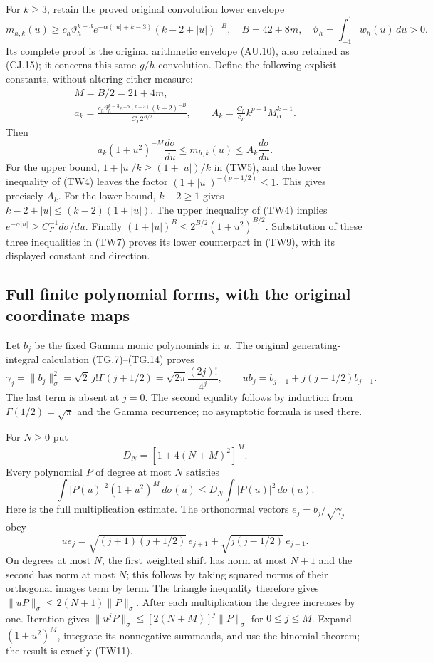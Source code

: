 \documentclass[11pt,a4paper]{article}
\begin{document}
For $k\geq3$, retain the proved original convolution lower envelope
\[
 m_{h,k}(u)\geq c_h\vartheta_h^{k-3}
 e^{-\alpha(|u|+k-3)}(k-2+|u|)^{-B},\quad
 B=42+8m,\quad \vartheta_h=\int_{-1}^{1}w_h(u)\,du>0.
 \tag{TW7}
\]
Its complete proof is the original arithmetic envelope (AU.10), also
retained as (CJ.15); it concerns this same $g/h$ convolution.
Define the following explicit constants, without altering either measure:
\[
 \begin{gathered}
 M=B/2=21+4m,\\
 a_k=\frac{c_h\vartheta_h^{k-3}e^{-\alpha(k-3)}(k-2)^{-B}}
 {C_\Gamma 2^{B/2}},\qquad
 A_k=\frac{C_h}{c_\Gamma}k^{p+1}M_\alpha^{k-1}.
 \end{gathered}\tag{TW8}
\]
Then
\[
 \boxed{
 a_k(1+u^2)^{-M}\frac{d\sigma}{du}
 \leq m_{h,k}(u)\leq A_k\frac{d\sigma}{du}.}
 \tag{TW9}
\]
For the upper bound, $1+|u|/k\geq(1+|u|)/k$ in (TW5), and the
lower inequality of (TW4) leaves the factor
$(1+|u|)^{-(p-1/2)}\leq1$.  This gives precisely $A_k$.
For the lower bound, $k-2\geq1$ gives
$k-2+|u|\leq(k-2)(1+|u|)$.  The upper inequality of (TW4) implies
$e^{-\alpha|u|}\geq C_\Gamma^{-1}d\sigma/du$.
Finally $(1+|u|)^B\leq2^{B/2}(1+u^2)^{B/2}$.
Substitution of these three inequalities in (TW7) proves its lower
counterpart in (TW9), with its displayed constant and direction.

\subsection{Full finite polynomial forms, with the original coordinate maps}

Let $b_j$ be the fixed Gamma monic polynomials in $u$.  The original
generating-integral calculation (TG.7)--(TG.14) proves
\[
 \gamma_j=\|b_j\|_\sigma^2
 =\sqrt2\,j!\Gamma(j+1/2)
 =\sqrt{2\pi}\frac{(2j)!}{4^j},\qquad
 u b_j=b_{j+1}+j(j-1/2)b_{j-1}.
 \tag{TW10}
\]
The last term is absent at $j=0$.  The second equality follows by
induction from $\Gamma(1/2)=\sqrt\pi$ and the Gamma recurrence; no
asymptotic formula is used there.

For $N\geq0$ put
\[
 D_N=[1+4(N+M)^2]^M.
\]
Every polynomial $P$ of degree at most $N$ satisfies
\[
 \int |P(u)|^2(1+u^2)^M\,d\sigma(u)
 \leq D_N\int |P(u)|^2\,d\sigma(u).
 \tag{TW11}
\]
Here is the full multiplication estimate.  The orthonormal vectors
$e_j=b_j/\sqrt{\gamma_j}$ obey
\[
 u e_j=\sqrt{(j+1)(j+1/2)}\,e_{j+1}
       +\sqrt{j(j-1/2)}\,e_{j-1}.
\]
On degrees at most $N$, the first weighted shift has norm at most
$N+1$ and the second has norm at most $N$; this follows by taking
squared norms of their orthogonal images term by term.
The triangle inequality therefore gives
$\|uP\|_\sigma\leq2(N+1)\|P\|_\sigma$.
After each multiplication the degree increases by one.  Iteration gives
$\|u^jP\|_\sigma\leq[2(N+M)]^j\|P\|_\sigma$ for $0\leq j\leq M$.
Expand $(1+u^2)^M$, integrate its nonnegative summands, and use the
binomial theorem; the result is exactly (TW11).
\end{document}
